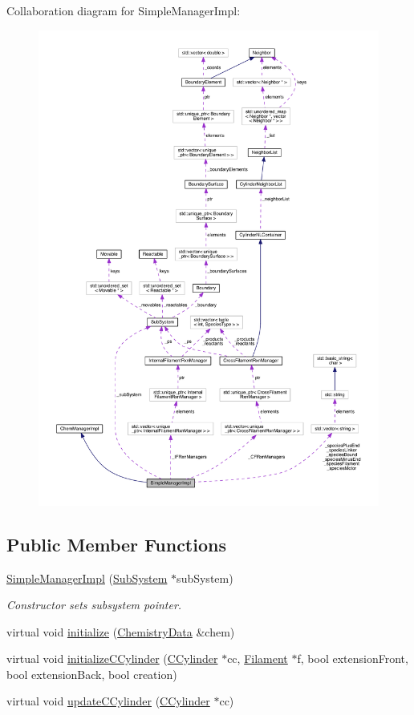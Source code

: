 Collaboration diagram for Simple\+Manager\+Impl\+:\nopagebreak
\begin{figure}[H]
\begin{center}
\leavevmode
\includegraphics[width=350pt]{classSimpleManagerImpl__coll__graph}
\end{center}
\end{figure}
\subsection*{Public Member Functions}
\begin{DoxyCompactItemize}
\item 
\hyperlink{classSimpleManagerImpl_a7a427f95f5745e69aa57cb63a0570915}{Simple\+Manager\+Impl} (\hyperlink{classSubSystem}{Sub\+System} $\ast$sub\+System)
\begin{DoxyCompactList}\small\item\em Constructor sets subsystem pointer. \end{DoxyCompactList}\item 
virtual void \hyperlink{classSimpleManagerImpl_a1db7aeaed44ae7c9cdc506176af6d186}{initialize} (\hyperlink{structChemistryData}{Chemistry\+Data} \&chem)
\item 
virtual void \hyperlink{classSimpleManagerImpl_ae4e23427c4e406bb9ad99d13099f7f02}{initialize\+C\+Cylinder} (\hyperlink{classCCylinder}{C\+Cylinder} $\ast$cc, \hyperlink{classFilament}{Filament} $\ast$f, bool extension\+Front, bool extension\+Back, bool creation)
\item 
virtual void \hyperlink{classSimpleManagerImpl_af8546bec65b406009203066059f88052}{update\+C\+Cylinder} (\hyperlink{classCCylinder}{C\+Cylinder} $\ast$cc)
\end{DoxyCompactItemize}
